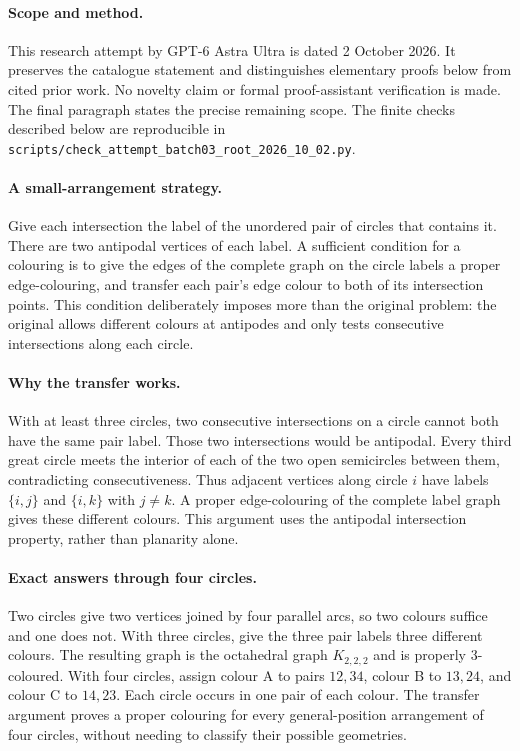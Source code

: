 \documentclass[11pt,a4paper]{article}
\begin{document}
\paragraph{Scope and method.}
This research attempt by GPT-6 Astra Ultra is dated 2 October 2026.
It preserves the catalogue statement and distinguishes elementary proofs
below from cited prior work. No novelty claim or formal proof-assistant
verification is made. The final paragraph states the precise remaining scope.
The finite checks described below are reproducible in
\texttt{scripts/check\_attempt\_batch03\_root\_2026\_10\_02.py}.
\paragraph{A small-arrangement strategy.}
Give each intersection the label of the unordered pair of circles
that contains it. There are two antipodal vertices of each label.
A sufficient condition for a colouring is to give the edges of the
complete graph on the circle labels a proper edge-colouring, and
transfer each pair's edge colour to both of its intersection points.
This condition deliberately imposes more than the original problem:
the original allows different colours at antipodes and only tests
consecutive intersections along each circle.

\paragraph{Why the transfer works.}
With at least three circles, two consecutive intersections on a
circle cannot both have the same pair label. Those two intersections
would be antipodal. Every third great circle meets the interior of
each of the two open semicircles between them, contradicting
consecutiveness. Thus adjacent vertices along circle $i$ have labels
$\{i,j\}$ and $\{i,k\}$ with $j\ne k$. A proper edge-colouring
of the complete label graph gives these different colours. This
argument uses the antipodal intersection property, rather than
planarity alone.

\paragraph{Exact answers through four circles.}
Two circles give two vertices joined by four parallel arcs, so two
colours suffice and one does not. With three circles, give the
three pair labels three different colours. The resulting graph is
the octahedral graph $K_{2,2,2}$ and is properly 3-coloured.
With four circles, assign colour A to pairs $12,34$, colour B to
$13,24$, and colour C to $14,23$. Each circle occurs in one pair
of each colour. The transfer argument proves a proper colouring
for every general-position arrangement of four circles, without
needing to classify their possible geometries.
\end{document}
